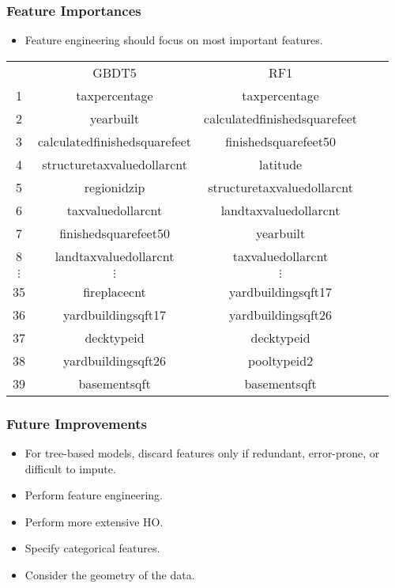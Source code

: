 \documentclass{beamer}
\begin{document}
\begin{frame}
\frametitle{Feature Importances}
\begin{itemize}
\item Feature engineering should focus on most important features.
\end{itemize}
\begin{center}
\footnotesize
\begin{tabular}{|c|c|c|c|c|} \hline
\quad & GBDT5 & RF1 & \\
1 & taxpercentage & taxpercentage \\
2 & yearbuilt & calculatedfinishedsquarefeet \\
3 & calculatedfinishedsquarefeet & finishedsquarefeet50 \\
4 & structuretaxvaluedollarcnt & latitude \\
5 & regionidzip & structuretaxvaluedollarcnt \\
6 & taxvaluedollarcnt & landtaxvaluedollarcnt \\
7 & finishedsquarefeet50 & yearbuilt \\
8 & landtaxvaluedollarcnt & taxvaluedollarcnt \\
$\vdots$ & $\vdots$ & $\vdots$ \\
35 & fireplacecnt & yardbuildingsqft17 \\
36 & yardbuildingsqft17 & yardbuildingsqft26 \\
37 & decktypeid & decktypeid \\
38 & yardbuildingsqft26 & pooltypeid2 \\
39 & basementsqft & basementsqft \\
\hline
\end{tabular}
\end{center}
\end{frame}

\begin{frame}
\frametitle{Future Improvements}
\begin{itemize}
\item For tree-based models, discard features only if redundant, error-prone, or difficult to impute.
\item Perform feature engineering.
\item Perform more extensive HO.
\item Specify categorical features.
\item Consider the geometry of the data.
\end{itemize}
\end{frame}
\end{document}
